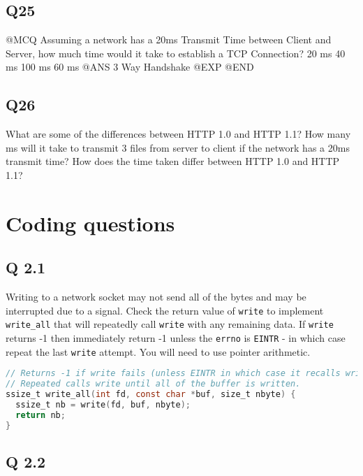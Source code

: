 \subsection{Q25}\label{q25}

@MCQ Assuming a network has a 20ms Transmit Time between Client and Server, how much time would it take to establish a TCP Connection? 20 ms 40 ms 100 ms 60 ms @ANS 3 Way Handshake @EXP @END

\subsection{Q26}\label{q26}

What are some of the differences between HTTP 1.0 and HTTP 1.1? How many ms will it take to transmit 3 files from server to client if the network has a 20ms transmit time? How does the time taken differ between HTTP 1.0 and HTTP 1.1?

\hypertarget{coding-questions}{\section{Coding questions}\label{coding-questions}}

\subsection{Q 2.1}\label{q-2.1-1}

Writing to a network socket may not send all of the bytes and may be interrupted due to a signal. Check the return value of \texttt{write} to implement \texttt{write\_all} that will repeatedly call \texttt{write} with any remaining data. If \texttt{write} returns -1 then immediately return -1 unless the \texttt{errno} is \texttt{EINTR} - in which case repeat the last \texttt{write} attempt. You will need to use pointer arithmetic.

\begin{lstlisting}[language=C]
// Returns -1 if write fails (unless EINTR in which case it recalls write
// Repeated calls write until all of the buffer is written.
ssize_t write_all(int fd, const char *buf, size_t nbyte) {
  ssize_t nb = write(fd, buf, nbyte);
  return nb;
}
\end{lstlisting}

\subsection{Q 2.2}\label{q-2.2}

